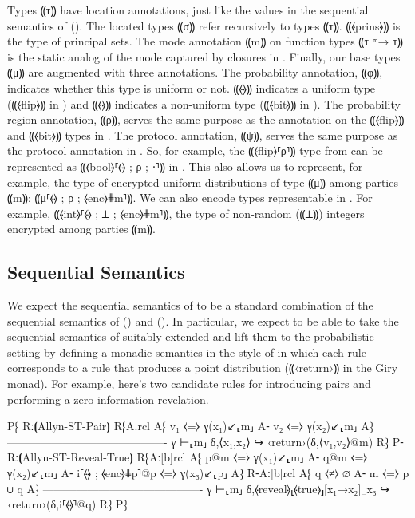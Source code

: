 Types ⸨τ⸩ have location annotations, just like the values in the sequential semantics of \mpc ().
The located types ⸨σ⸩ refer recursively to types ⸨τ⸩. ⸨⦑prins⦒⸩ is the type of principal sets. The mode annotation ⸨m⸩ on function types ⸨τ ᵐ→ τ⸩ is the static
analog of the mode captured by closures in \mpc. Finally, our base types ⸨μ⸩ are augmented with three annotations. The probability
annotation, ⸨φ⸩, indicates whether this type is uniform or not. ⸨⦑\faThumbsUp⦒⸩ indicates a uniform type (⸨⦑flip⦒⸩ in
\obliv) and ⸨⦑\faThumbsDown⦒⸩ indicates a non-uniform type (⸨⦑bit⦒⸩ in \obliv). The probability region annotation, ⸨ρ⸩,
serves the same purpose as the annotation on the ⸨⦑flip⦒⸩ and ⸨⦑bit⦒⸩ types in \obliv. The protocol annotation, ⸨ψ⸩,
serves the same purpose as the protocol annotation in \mpc. So, for example, the ⸨⦑flip⦒⸢ρ⸣⸩ type from \obliv can be
represented as ⸨⦑bool⦒⸢⦑\faThumbsUp⦒ ; ρ ; ⋅⸣⸩ in \lang. This also allows us to represent, for example, the type
of encrypted uniform distributions of type ⸨μ⸩ among parties ⸨m⸩: ⸨μ⸢⦑\faThumbsUp⦒ ; ρ ; ⦑enc⦒⋕m⸣⸩. We can
also encode types representable in \mpc. For example, ⸨⦑int⦒⸢⦑\faThumbsDown⦒ ; ⊥ ; ⦑enc⦒⋕m⸣⸩, the type of non-random
(⸨⊥⸩) integers encrypted among parties ⸨m⸩.

\subsection{Sequential Semantics}
\label{subsec:proposal-design-seq}

We expect the sequential semantics of \lang to be a standard combination of the sequential
semantics of \mpc () and \obliv (). In particular, we
expect to be able to take the sequential semantics of \mpc suitably extended and lift them
to the probabilistic setting by defining a monadic semantics in the style of \obliv in which
each \mpc rule corresponds to a \lang rule that produces a point distribution (⸨‹return›⸩ in
the Giry monad). For example, here's two candidate rules for introducing pairs and performing
a zero-information revelation.

P⁅ Rː⦗Allyn-ST-Pair⦘
   R⁅{Aːrcl
      A⁅ v₁ ⧼=⧽ γ(x₁)↙⸤m⸥
      A⁃ v₂ ⧼=⧽ γ(x₂)↙⸤m⸥
      A⁆}
      -------------------------------------------
      γ ⊢⸤m⸥ δ,⟨x₁,x₂⟩ ↪ ‹return›(δ,⟨v₁,v₂⟩@m)
      R⁆
P⁃ Rː⦗Allyn-ST-Reveal-True⦘
   R⁅{Aː[b]rcl
      A⁅ p@m          ⧼=⧽ γ(x₁)↙⸤m⸥
      A⁃ q@m          ⧼=⧽ γ(x₂)↙⸤m⸥
      A⁃ i⸢⦑\faThumbsUp⦒ ; ⦑enc⦒⋕p⸣@p ⧼=⧽ γ(x₃)↙⸤p⸥
      A⁆}
   R⁃{Aː[b]rcl
      A⁅ q ⧼≠⧽ ∅
      A⁃ m ⧼=⧽ p ∪ q
      A⁆}
      -------------------------------------------
      γ ⊢⸤m⸥ δ,⦑reveal⦒⸤⦑true⦒⸥[x₁→x₂]␣x₃ ↪ ‹return›(δ,i⸢⦑\faThumbsDown⦒⸣@q)
   R⁆
P⁆

